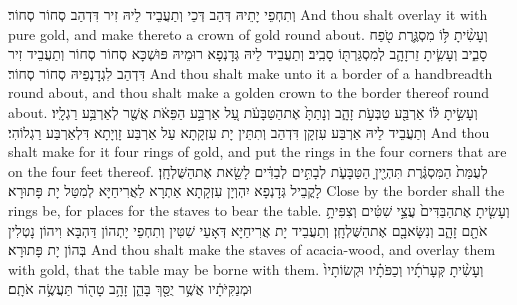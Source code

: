 {וְתִחְפֵי יָתֵיהּ דְּהַב דְּכֵי וְתַעֲבֵיד לֵיהּ זִיר דִּדְהַב סְחוֹר סְחוֹר׃}
{And thou shalt overlay it with pure gold, and make thereto a crown of gold round about.}{}
{וְעָשִׂ֨יתָ לּ֥וֹ מִסְגֶּ֛רֶת טֹ֖פַח סָבִ֑יב וְעָשִׂ֧יתָ זֵר\maqqaf זָהָ֛ב לְמִסְגַּרְתּ֖וֹ סָבִֽיב׃}
{וְתַעֲבֵיד לֵיהּ גְּדָנְפָא רוּמֵיהּ פּוּשְׁכָּא סְחוֹר סְחוֹר וְתַעֲבֵיד זִיר דִּדְהַב לִגְדָנְפֵיהּ סְחוֹר סְחוֹר׃}
{And thou shalt make unto it a border of a handbreadth round about, and thou shalt make a golden crown to the border thereof round about.}{}
{וְעָשִׂ֣יתָ לּ֔וֹ אַרְבַּ֖ע טַבְּעֹ֣ת זָהָ֑ב וְנָתַתָּ֙ אֶת\maqqaf הַטַּבָּעֹ֔ת עַ֚ל אַרְבַּ֣ע הַפֵּאֹ֔ת אֲשֶׁ֖ר לְאַרְבַּ֥ע רַגְלָֽיו׃}
{וְתַעֲבֵיד לֵיהּ אַרְבַּע עִזְקָן דִּדְהַב וְתִתֵּין יָת עִזְקָתָא עַל אַרְבַּע זָוְיָתָא דִּלְאַרְבַּע רַגְלוֹהִי׃}
{And thou shalt make for it four rings of gold, and put the rings in the four corners that are on the four feet thereof.}{}
{לְעֻמַּת֙ הַמִּסְגֶּ֔רֶת תִּהְיֶ֖יןָ הַטַּבָּעֹ֑ת לְבָתִּ֣ים לְבַדִּ֔ים לָשֵׂ֖את אֶת\maqqaf הַשֻּׁלְחָֽן׃}
{לָקֳבֵיל גְּדָנְפָא יִהְוְיָן עִזְקָתָא אַתְרָא לַאֲרִיחַיָּא לְמִטַּל יָת פָּתוּרָא׃}
{Close by the border shall the rings be, for places for the staves to bear the table.}{}
{וְעָשִׂ֤יתָ אֶת\maqqaf הַבַּדִּים֙ עֲצֵ֣י שִׁטִּ֔ים וְצִפִּיתָ֥ אֹתָ֖ם זָהָ֑ב וְנִשָּׂא\maqqaf בָ֖ם אֶת\maqqaf הַשֻּׁלְחָֽן׃}
{וְתַעֲבֵיד יָת אֲרִיחַיָּא דְּאָעֵי שִׁטִּין וְתִחְפֵי יָתְהוֹן דַּהְבָּא וִיהוֹן נָטְלִין בְּהוֹן יָת פָּתוּרָא׃}
{And thou shalt make the staves of acacia-wood, and overlay them with gold, that the table may be borne with them.}{}
{וְעָשִׂ֨יתָ קְּעָרֹתָ֜יו וְכַפֹּתָ֗יו וּקְשׂוֹתָיו֙ וּמְנַקִּיֹּתָ֔יו אֲשֶׁ֥ר יֻסַּ֖ךְ בָּהֵ֑ן זָהָ֥ב טָה֖וֹר תַּעֲשֶׂ֥ה אֹתָֽם׃}
